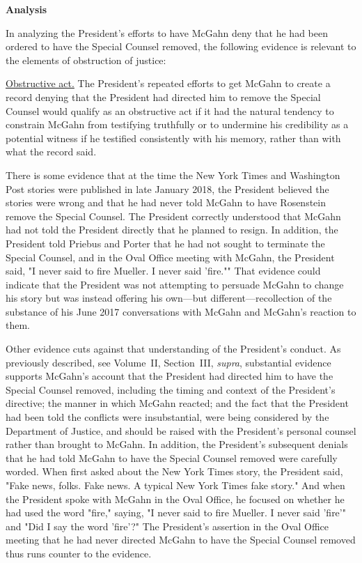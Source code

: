 {\begin{center}
\textbf{Analysis}
\end{center}

In analyzing the President's efforts to have McGahn deny that he had been ordered to have the Special Counsel removed, the following evidence is relevant to the elements of obstruction of justice:

\underline{Obstructive act.}
The President's repeated efforts to get McGahn to create a record denying that the President had directed him to remove the Special Counsel would qualify as an obstructive act if it had the natural tendency to constrain McGahn from testifying truthfully or to undermine his credibility as a potential witness if he testified consistently with his memory, rather than with what the record said.

There is some evidence that at the time the New York Times and Washington Post stories were published in late January 2018, the President believed the stories were wrong and that he had never told McGahn to have Rosenstein remove the Special Counsel.
The President correctly understood that McGahn had not told the President directly that he planned to resign.
In addition, the President told Priebus and Porter that he had not sought to terminate the Special Counsel, and in the Oval Office meeting with McGahn, the President said, "I never said to fire Mueller.
I never said 'fire.""
That evidence could indicate that the President was not attempting to persuade McGahn to change his story but was instead offering his own---but different---recollection of the substance of his June 2017 conversations with McGahn and McGahn's reaction to them.

Other evidence cuts against that understanding of the President's conduct.
As previously described, see Volume~II, Section~III, \textit{supra}, substantial evidence supports McGahn's account that the President had directed him to have the Special Counsel removed, including the timing and context of the President's directive;
the manner in which McGahn reacted;
and the fact that the President had been told the conflicts were insubstantial, were being considered by the Department of Justice, and should be raised with the President's personal counsel rather than brought to McGahn.
In addition, the President's subsequent denials that he had told McGahn to have the Special Counsel removed were carefully worded.
When first asked about the New York Times story, the President said, "Fake news, folks.
Fake news.
A typical New York Times fake story." And when the President spoke with McGahn in the Oval Office, he focused on whether he had used the word "fire," saying, "I never said to fire Mueller.
I never said 'fire'" and "Did I say the word 'fire'?" The President's assertion in the Oval Office meeting that he had never directed McGahn to have the Special Counsel removed thus runs counter to the evidence.

}
